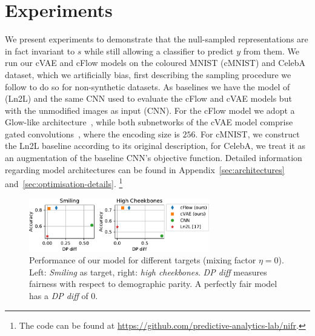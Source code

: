 
\section{Experiments}
\noindent We present experiments to demonstrate that the null-sampled representations are in fact invariant to $s$
while still allowing a classifier to predict $y$ from them.
We run our cVAE and cFlow models on the coloured MNIST (cMNIST) and CelebA dataset,
which we artificially bias, first describing the sampling procedure we follow to do so for non-synthetic datasets.
As baselines we have the model of~\citet{kim2019learning} (Ln2L) and the same CNN used to evaluate the cFlow and cVAE models
but with the unmodified images as input (CNN).
For the cFlow model we adopt a Glow-like architecture~\citep{KinDha18},
while both subnetworks of the cVAE model comprise gated convolutions~\citep{van2016conditional}, where the encoding size is $256$.
For cMNIST, we construct the Ln2L baseline according to its original description, for CelebA,
we treat it as an augmentation of the baseline CNN's objective function.
Detailed information regarding model architectures can be found in Appendix~\ref{sec:architectures} and~\ref{sec:optimisation-details}.%
\footnote{The code can be found at \url{https://github.com/predictive-analytics-lab/nifr}.}
\begin{figure}[tb]
    \centering
    \includegraphics[width=0.7\textwidth]{paper2/Figures/nosinn_celeba.pdf}
    \caption{
        Performance of our model for different targets (mixing factor $\eta=0$).
        Left: \emph{Smiling} as target, right: \emph{high cheekbones}.
        \emph{DP diff} measures fairness with respect to demographic parity.
        A perfectly fair model has a \emph{DP diff} of 0.
    }%
    \label{fig:celeba-targets}
\end{figure}

